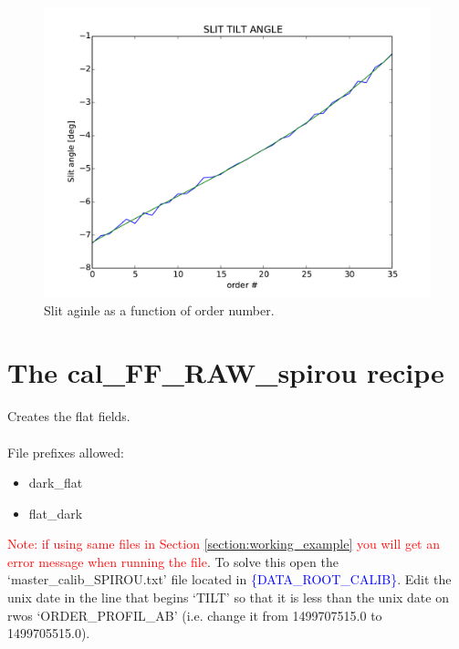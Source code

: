 \begin{figure}
\begin{center}
\includegraphics[width=.8\textwidth]{figures/cal_SLIT_spirou_2.pdf}
\caption{Slit aginle as a function of order number. \label{figure:cal_slit_spirou_2}}
\end{center}
\end{figure}

\clearpage
\newpage
\section{The cal\_FF\_RAW\_spirou recipe}
\label{section:cal_FF_RAW_spirou}

Creates the flat fields. \\ 

 \\

\noindent File prefixes allowed:
\begin{itemize}
	\item dark\_flat
	\item flat\_dark
\end{itemize}

\noindent \textcolor{red}{Note: if using same files in Section \ref{section:working_example} you will get an error message when running the file}.
\noindent To solve this open the `master\_calib\_SPIROU.txt' file located in \textcolor{blue}{\{DATA\_ROOT\_CALIB\}}. Edit the unix date in the line that begins `TILT' so that it is less than the unix date on rwos `ORDER\_PROFIL\_AB' (i.e. change it from 1499707515.0 to 1499705515.0).

